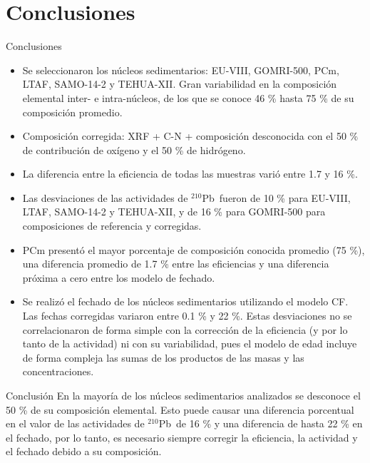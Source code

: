 \documentclass[9pt]{beamer}
\newcommand{\PbCero}{$^{210}$Pb}
\begin{document}
\section{Conclusiones}

\begin{frame}{Conclusiones}
\begin{itemize}
\item \justifying  Se seleccionaron los núcleos sedimentarios: EU-VIII, GOMRI-500, PCm, LTAF, SAMO-14-2 y TEHUA-XII. Gran variabilidad en la composición elemental inter- e intra-núcleos, de los que se conoce 46 \% hasta 75 \% de su composición promedio. 

\item \justifying  Composición corregida: XRF + C-N + composición desconocida con el 50 \% de contribución de oxígeno y el 50 \% de hidrógeno. 

\item \justifying  La diferencia entre la eficiencia de todas las muestras varió entre 1.7 y 16 \%. 

\item \justifying  Las desviaciones de las actividades de \PbCero\, fueron de 10 \% para EU-VIII, LTAF, SAMO-14-2 y TEHUA-XII, y de 16 \% para GOMRI-500 para composiciones de referencia y corregidas. 

\item \justifying  PCm presentó el mayor porcentaje de composición conocida promedio (75 \%), una diferencia promedio de 1.7 \% entre las eficiencias y una diferencia próxima a cero entre los modelo de fechado. 

\item \justifying  Se realizó el fechado de los núcleos sedimentarios utilizando el modelo CF. Las fechas corregidas variaron entre 0.1 \% y 22 \%. Estas desviaciones no se correlacionaron de forma simple con la corrección de la eficiencia (y por lo tanto de la actividad) ni con su variabilidad, pues el modelo de edad incluye de forma compleja las sumas de los productos de las masas y las concentraciones. 
\end{itemize}
\begin{flushright}
\hyperlink{Portada}{}
\end{flushright}
\end{frame}
\begin{frame}{Conclusión}
\justifying En la mayoría de los núcleos sedimentarios analizados se desconoce el 50 \% de su composición elemental. Esto puede causar una diferencia porcentual en el valor de las actividades de \PbCero\, de 16 \% y una diferencia de hasta 22 \% en el fechado, por lo tanto, es necesario siempre corregir la eficiencia, la actividad y el fechado debido a su composición. 
\begin{flushright}
\hyperlink{Portada}{}
\end{flushright}
\end{frame}
\end{document}
